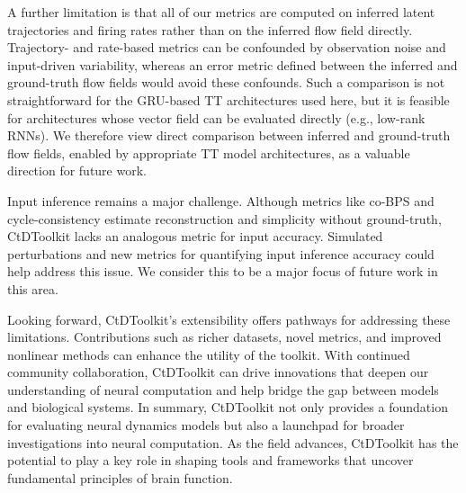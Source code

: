 \documentclass{article}
\begin{document}
A further limitation is that all of our metrics are computed on inferred latent trajectories and firing rates rather than on the inferred flow field directly. Trajectory- and rate-based metrics can be confounded by observation noise and input-driven variability, whereas an error metric defined between the inferred and ground-truth flow fields would avoid these confounds. Such a comparison is not straightforward for the GRU-based TT architectures used here, but it is feasible for architectures whose vector field can be evaluated directly (e.g., low-rank RNNs). We therefore view direct comparison between inferred and ground-truth flow fields, enabled by appropriate TT model architectures, as a valuable direction for future work.

Input inference remains a major challenge. Although metrics like co-BPS and cycle-consistency estimate reconstruction and simplicity without ground-truth, CtDToolkit lacks an analogous metric for input accuracy. Simulated perturbations and new metrics for quantifying input inference accuracy could help address this issue. We consider this to be a major focus of future work in this area.

Looking forward, CtDToolkit’s extensibility offers pathways for addressing these limitations. Contributions such as richer datasets, novel metrics, and improved nonlinear methods can enhance the utility of the toolkit. With continued community collaboration, CtDToolkit can drive innovations that deepen our understanding of neural computation and help bridge the gap between models and biological systems. In summary, CtDToolkit not only provides a foundation for evaluating neural dynamics models but also a launchpad for broader investigations into neural computation. As the field advances, CtDToolkit has the potential to play a key role in shaping tools and frameworks that uncover fundamental principles of brain function.
\end{document}
